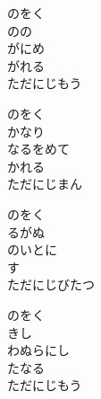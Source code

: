 \documentclass[10pt,b5j]{tarticle} %
\begin{document}
\vspace{1.5em} %
\newcommand{\linespace}{0.5em} %
\newcommand{\blocksize}{0.5\hsize} %
\begin{enumerate} %
    \begin{minipage}[c]{\blocksize}
    
        \vspace{\linespace}
        \item
        のをく\\
        のの\\
        がにめ\\
        がれる\\
        ただにじもう
        
        \vspace{\linespace}
        \item
        のをく\\
        かなり\\
        なるをめて\\
        かれる\\
        ただにじまん
        
        \vspace{\linespace}
        \item
        のをく\\
        るがぬ\\
        のいとに\\
        す\\
        ただにじびたつ
        
        \vspace{\linespace}
        \item
        のをく\\
        きし\\
        わぬらにし\\
        たなる\\
        ただにじもう
    
    \end{minipage}
\end{enumerate} %
\end{document}
